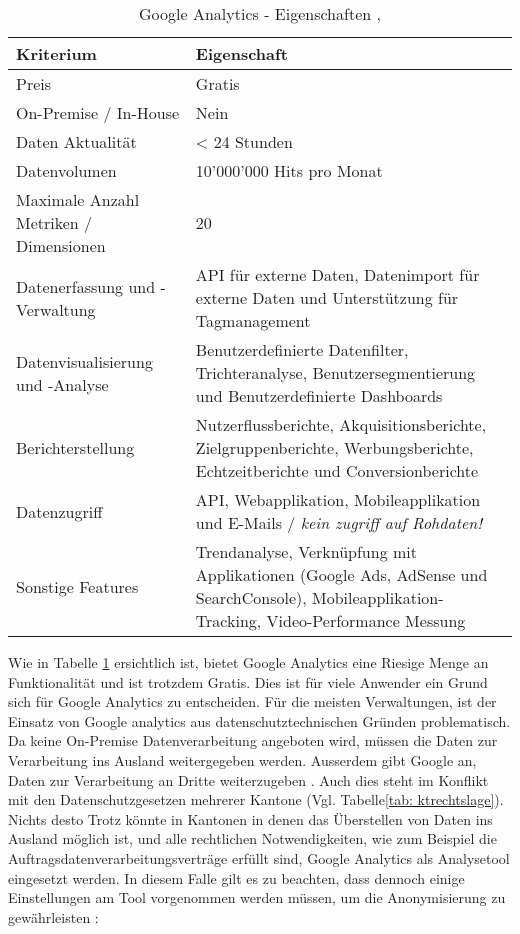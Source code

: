 \begin{table}[h]
	\centering
	\begin{tabular}{ | l | p{12cm} |}
		\hline
		\textbf{Kriterium} & \textbf{Eigenschaft}  \\ 
		\hline
		Preis & Gratis \\
		On-Premise / In-House & Nein \\
		Daten Aktualität & < 24 Stunden \\
		Datenvolumen & 10'000'000 Hits pro Monat\\
		Maximale Anzahl Metriken / Dimensionen & 20\\
		Datenerfassung und -Verwaltung & API für externe Daten, Datenimport für externe Daten und Unterstützung für Tagmanagement\\
		Datenvisualisierung und -Analyse & Benutzerdefinierte Datenfilter, Trichteranalyse, Benutzersegmentierung und Benutzerdefinierte Dashboards\\
		Berichterstellung & Nutzerflussberichte, Akquisitionsberichte, Zielgruppenberichte, Werbungsberichte, Echtzeitberichte und Conversionberichte \\
		Datenzugriff & API, Webapplikation, Mobileapplikation und E-Mails / \textit{kein zugriff auf Rohdaten!}\\
		Sonstige Features & Trendanalyse, Verknüpfung mit Applikationen (Google Ads, AdSense und SearchConsole), Mobileapplikation-Tracking, Video-Performance Messung\\
		\hline  
	\end{tabular}
	\caption{Google Analytics - Eigenschaften \parencite {GoogleAnalyticsCompare}, \parencite{GoogleAnalyticsFeatures}}
	\label{tab: googleAnalyticsFeatures}
\end{table}

Wie in Tabelle \ref{tab: googleAnalyticsFeatures} ersichtlich ist, bietet Google Analytics eine Riesige Menge an Funktionalität und ist trotzdem Gratis. Dies ist für viele Anwender ein Grund sich für Google Analytics zu entscheiden. Für die meisten Verwaltungen, ist der Einsatz von Google analytics aus datenschutztechnischen Gründen problematisch. Da keine On-Premise Datenverarbeitung angeboten wird, müssen die Daten zur Verarbeitung ins Ausland weitergegeben werden. Ausserdem gibt Google an, Daten zur Verarbeitung an Dritte weiterzugeben \parencite{GoogleInfoSharing}. Auch dies steht im Konflikt mit den Datenschutzgesetzen mehrerer Kantone (Vgl. Tabelle\ref{tab: ktrechtslage}). Nichts desto Trotz könnte in Kantonen in denen das Überstellen von Daten ins Ausland möglich ist, und alle rechtlichen Notwendigkeiten, wie zum Beispiel die Auftragsdatenverarbeitungsverträge erfüllt sind, Google Analytics als Analysetool eingesetzt werden. In diesem Falle gilt es zu beachten, dass dennoch einige Einstellungen am Tool vorgenommen werden müssen, um die Anonymisierung zu gewährleisten \parencite{GoogleAnalyticsDatenschutzEinstellungen}: 

